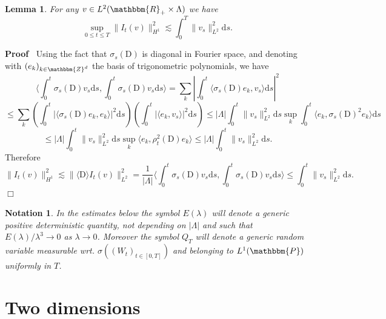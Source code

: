 \documentclass[11pt, oneside]{article}   	%
\newcommand{\mathD}{\mathrm{D}}
\newcommand{\mathd}{\mathrm{d}}
\newenvironment{proof}{\noindent\textbf{Proof\ }}{\hspace*{\fill}$\Box$\medskip}
\newtheorem{lemma}{Lemma}
\newtheorem{notation}{Notation}
\begin{document}
\begin{lemma}
  \label{lemma:reg-drift}For any $v \in L^2 (\mathbbm{R}_+ \times \Lambda)$ we
  have
  \[ \sup_{0 \leqslant t \leqslant T} \| I_t (v) \|_{H^1}^2 \lesssim \int_0^T
     \| v_s \|^2_{L^2} \mathd s. \]
\end{lemma}

\begin{proof}
  Using the fact that $\sigma_s (\mathD)$ is diagonal in Fourier space, and
  denoting with $(e_k)_{k \in \mathbbm{Z}^d}$ the basis of trigonometric
  polynomials, we have
  \[ \langle \int_0^t \sigma_s (\mathD) v_s \mathd s, \int_0^t \sigma_s
     (\mathD) v_s \mathd s \rangle = \sum_k \left| \int_0^t \langle \sigma_s
     (\mathD) e_k, v_s \rangle \mathd s \right|^2 \]
  \[ \leqslant \sum_k \left( \int_0^t | \langle \sigma_s (\mathD) e_k, e_k
     \rangle |^2 \mathd s \right) \left( \int_0^t | \langle e_k, v_s \rangle
     |^2 \mathd s \right) \leqslant | \Lambda | \int_0^t \| v_s \|^2_{L^2}
     \mathd s \sup_k \int_0^t \langle e_k, \sigma_s (\mathD)^2 e_k \rangle
     \mathd s \]
  \[ \leqslant | \Lambda | \int_0^t \| v_s \|^2_{L^2} \mathd s \sup_k \langle
     e_k, \rho_t^2 (\mathD) e_k \rangle \leqslant | \Lambda | \int_0^t \| v_s
     \|^2_{L^2} \mathd s. \]
  Therefore
  \[ \| I_t (v) \|_{H^1}^2 \lesssim \| \langle \mathD \rangle I_t (v)
     \|_{L^2}^2 = \frac{1}{| \Lambda |} \langle \int_0^t \sigma_s (\mathD) v_s
     \mathd s, \int_0^t \sigma_s (\mathD) v_s \mathd s \rangle \leqslant
     \int_0^t \| v_s \|^2_{L^2} \mathd s. \]
\end{proof}

\begin{notation}
  In the estimates below the symbol $E (\lambda)$ will denote a generic
  positive deterministic quantity, not depending on $| \Lambda |$ and such
  that $E (\lambda) / \lambda^3 \rightarrow 0$ as $\lambda \rightarrow 0$.
  Moreover the symbol $Q_T$ will denote a generic random variable measurable
  wrt. $\sigma ((W_t)_{t \in [0, T]})$ and belonging to $L^1 (\mathbbm{P})$
  uniformly in $T$. 
\end{notation}

\section{Two dimensions}\label{sec:two-d}
\end{document}
